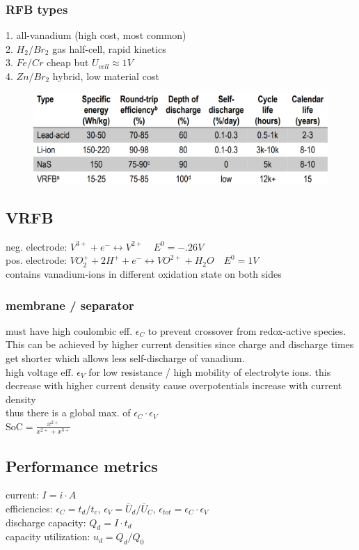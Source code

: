 \documentclass[a4paper,10pt,landscape]{scrartcl}
\begin{document}
\begin{multicols*}{3}
\subsubsection{RFB types}
1. all-vanadium (high cost, most common) \\
2. $H_2/Br_2$ gas half-cell, rapid kinetics \\
3. $Fe/Cr$ cheap but $U_{cell}\approx 1V$ \\
4. $Zn/Br_2$ hybrid, low material cost \\
\begin{figure}[H]
    \centering
    \includegraphics[width=1\linewidth]{src/RFB_comp.png}
\end{figure}
\subsection{VRFB}
neg. electrode: $V^{3+} + e^- \leftrightarrow V^{2+} \quad E^0=-.26V$ \\
pos. electrode: $VO_2^+ + 2H^+ + e^- \leftrightarrow VO^{2+} + H_2O \quad E^0=1V$ \\
contains vanadium-ions in different oxidation state on both sides

\subsubsection{membrane / separator}
must have high coulombic eff. $\epsilon_C$ to prevent crossover from redox-active species. This can be achieved by higher current densities since charge and discharge times get shorter which allows less self-discharge of vanadium. \\
high voltage eff. $\epsilon_V$ for low resistance / high mobility of electrolyte ions. this decrease with higher current density cause overpotentials increase with current density \\
thus there is a global max. of $\epsilon_C \cdot\epsilon_V$ \\
$\mathrm{SoC}=\frac{x^{2+}}{x^{2+}+x^{3+}}$
\subsection{Performance metrics}
current: $I=i\cdot A$ \\
efficiencies: $\epsilon_C=t_d/t_c$, $\epsilon_V=\overline{U}_d/\overline{U}_C$, $\epsilon_{tot}=\epsilon_C\cdot\epsilon_V$ \\
discharge capacity: $Q_d=I\cdot t_d$ \\
capacity utilization: $u_d=Q_d/Q_0$

\end{multicols*}
\end{document}
